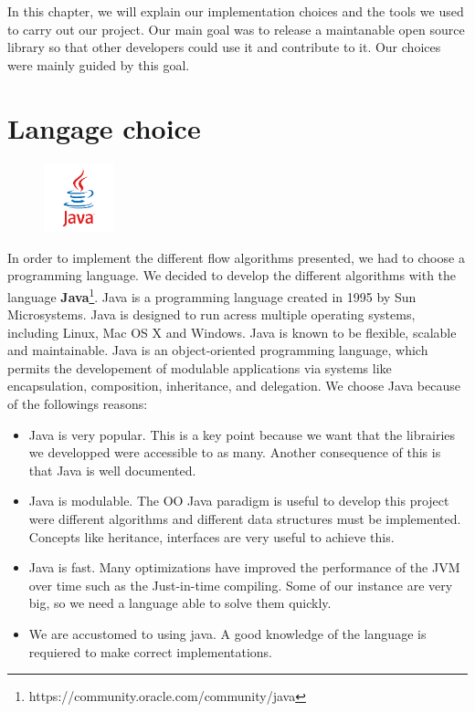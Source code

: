In this chapter, we will explain our implementation choices and the tools we used to carry out our project. Our main goal was to release a maintanable open source library so that other developers could use it and contribute to it. Our choices were mainly guided by this goal.

\section{Langage choice}

\begin{figure}
	\vspace{-8mm}
	\includegraphics[width =2cm]{images/Java_logo.png}
\end{figure}

In order to implement the different flow algorithms presented, we had to choose a programming language. We decided to develop the different algorithms with the language \textbf{Java}\footnote{https://community.oracle.com/community/java}. Java is a programming language created in 1995 by Sun Microsystems. Java is designed to run acress multiple operating systems, including Linux, Mac OS X and Windows. Java is known to be flexible, scalable and maintainable. Java is an object-oriented programming language, which permits the developement of modulable applications via systems like encapsulation, composition, inheritance, and delegation. We choose Java because of the followings reasons:
\begin{itemize}
	\item Java is very popular. This is a key point because we want that the librairies we developped were accessible to as many. Another consequence of this is that Java is well documented.
	\item Java is modulable. The OO Java paradigm is useful to develop this project were different algorithms and different data structures must be implemented. Concepts like heritance, interfaces are very useful to achieve this.
	\item Java is fast. Many optimizations have improved the performance of the JVM over time such as the Just-in-time compiling. Some of our instance are very big, so we need a language able to solve them quickly.
	\item We are accustomed to using java. A good knowledge of the language is requiered to make correct implementations.
\end{itemize}


